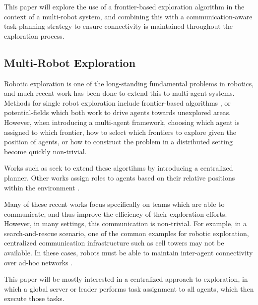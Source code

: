 \documentclass[conference]{IEEEtran}
\begin{document}
This paper will explore the use of a frontier-based exploration algorithm in the context of a multi-robot system,
and combining this with a communication-aware task-planning strategy to ensure connectivity is maintained throughout
the exploration process.

\subsection{Multi-Robot Exploration}
Robotic exploration is one of the long-standing fundamental problems in robotics, and much recent work has been done to extend this to multi-agent systems.
Methods for single robot exploration include frontier-based algorithms \cite{yamauchiFrontierbasedApproachAutonomous1997}, or potential-fields \cite{amigoniMultirobotExplorationCommunicationRestricted2017}
which both work to drive agents towards unexplored areas. However, when introducing a multi-agent framework, choosing which agent is assigned to which frontier,
how to select which frontiers to explore given the position of agents, or how to construct the problem in a distributed setting become quickly non-trivial.

Works such as \cite{burgardCoordinatedMultirobotExploration2005, andreCoordinatedMultirobotExploration2014} seek to extend these algortihms
by introducing a centralized planner. Other works assign roles to agents based on their relative positions within the environment \cite{dehoogRoleBasedAutonomousMultirobot2009}.

Many of these recent works focus specifically on teams which are able to communicate, and thus improve the efficiency of their exploration efforts.
However, in many settings, this communication is non-trivial. For example, in a search-and-rescue scenario, one of the common examples for robotic exploration,
centralized communication infrastructure such as cell towers may not be available. In these cases, robots must be able to maintain inter-agent
connectivity over ad-hoc networks \cite{qiuHeterogeneousAdHoc2017,falconiGraphBasedAlgorithmRobotic2012}.

This paper will be mostly interested in a centralized approach to exploration, in which a global server or leader performs task assignment to all agents,
which then execute those tasks. 
\end{document}
